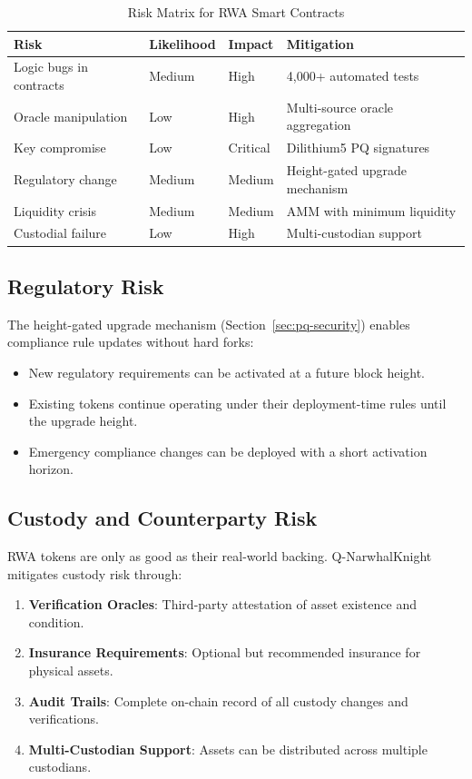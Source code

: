 \documentclass[11pt,a4paper,twoside]{article}
\begin{document}
\begin{table}[H]
\centering
\caption{Risk Matrix for RWA Smart Contracts}
\label{tab:risk-matrix}
\begin{tabular}{@{}llll@{}}
\toprule
\textbf{Risk} & \textbf{Likelihood} & \textbf{Impact} & \textbf{Mitigation} \\
\midrule
Logic bugs in contracts & Medium & High & 4,000+ automated tests \\
Oracle manipulation & Low & High & Multi-source oracle aggregation \\
Key compromise & Low & Critical & Dilithium5 PQ signatures \\
Regulatory change & Medium & Medium & Height-gated upgrade mechanism \\
Liquidity crisis & Medium & Medium & AMM with minimum liquidity \\
Custodial failure & Low & High & Multi-custodian support \\
\bottomrule
\end{tabular}
\end{table}

\subsection{Regulatory Risk}

The height-gated upgrade mechanism (Section~\ref{sec:pq-security}) enables compliance rule updates without hard forks:

\begin{itemize}
  \item New regulatory requirements can be activated at a future block height.
  \item Existing tokens continue operating under their deployment-time rules until the upgrade height.
  \item Emergency compliance changes can be deployed with a short activation horizon.
\end{itemize}

\subsection{Custody and Counterparty Risk}

RWA tokens are only as good as their real-world backing. Q-NarwhalKnight mitigates custody risk through:

\begin{enumerate}
  \item \textbf{Verification Oracles}: Third-party attestation of asset existence and condition.
  \item \textbf{Insurance Requirements}: Optional but recommended insurance for physical assets.
  \item \textbf{Audit Trails}: Complete on-chain record of all custody changes and verifications.
  \item \textbf{Multi-Custodian Support}: Assets can be distributed across multiple custodians.
\end{enumerate}
\end{document}
